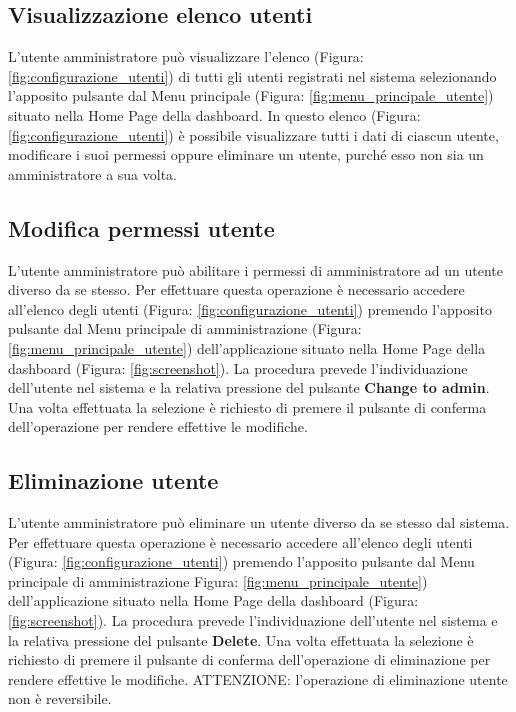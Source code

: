 	\pagebreak
	\subsection{Visualizzazione elenco utenti}
		L'utente amministratore può visualizzare l'elenco (Figura: \ref{fig:configurazione_utenti}) di tutti gli utenti registrati nel sistema selezionando l'apposito pulsante dal Menu principale (Figura: \ref{fig:menu_principale_utente}) situato nella Home Page della dashboard\gloss{}.
		In questo elenco (Figura: \ref{fig:configurazione_utenti}) è possibile visualizzare tutti i dati di ciascun utente, modificare  i suoi permessi oppure eliminare un utente, purché esso non sia un amministratore a sua volta.

	
	\subsection{Modifica permessi utente}
		L'utente amministratore può abilitare i permessi di amministratore ad un utente diverso da se stesso.\newline
		Per effettuare questa operazione è necessario accedere all'elenco degli utenti (Figura: \ref{fig:configurazione_utenti}) premendo l'apposito pulsante dal Menu principale di amministrazione (Figura: \ref{fig:menu_principale_utente}) dell'applicazione situato nella Home Page della dashboard (Figura: \ref{fig:screenshot}).
		La procedura prevede l'individuazione dell'utente nel sistema e la relativa pressione del pulsante \textbf{Change to admin}.\newline
		Una volta effettuata la selezione è richiesto di premere il pulsante di conferma dell'operazione per rendere effettive le modifiche.

	
	\subsection{Eliminazione utente}
		L'utente amministratore può eliminare un utente diverso da se stesso dal sistema.\newline
		Per effettuare questa operazione è necessario accedere all'elenco degli utenti (Figura: \ref{fig:configurazione_utenti}) premendo l'apposito pulsante dal Menu principale di amministrazione Figura: \ref{fig:menu_principale_utente}) dell'applicazione situato nella Home Page della dashboard (Figura: \ref{fig:screenshot}).
		La procedura prevede l'individuazione dell'utente nel sistema e la relativa pressione del pulsante \textbf{Delete}.\newline
		Una volta effettuata la selezione è richiesto di premere il pulsante di conferma dell'operazione di eliminazione per rendere effettive le modifiche.\newline
		ATTENZIONE: l'operazione di eliminazione utente non è reversibile.
		

